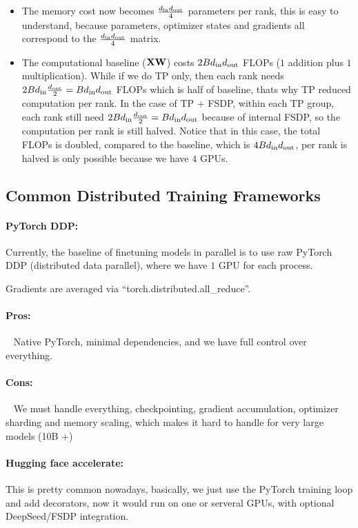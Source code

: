 \documentclass[11pt]{article}  %
\begin{document}
\begin{itemize}
  \item The memory cost now becomes $\frac{d_{\text{in}} d_{\text{out}}}{4}$ parameters per rank, this is easy to understand, because parameters, optimizer states and gradients all correspond to the $\frac{d_{\text{in}}d_{\text{out}}}{4}$ matrix.
  
  \item The computational baseline ($\mathbf{X}\mathbf{W}$) costs $2Bd_{\text{in}}d_{\text{out}}$ FLOPs ($1$ addition plus $1$ multiplication).
  While if we do TP only, then each rank needs $2Bd_{\text{in}} \frac{d_{\text{out}}}{2} = Bd_{\text{in}}d_{\text{out}}$ FLOPs which is half of baseline, thats why TP reduced computation per rank.
  In the case of TP + FSDP, within each TP group, each rank still need $2Bd_{\text{in}} \frac{d_{\text{out}}}{2} = Bd_{\text{in}}d_{\text{out}}$ because of internal FSDP, so the computation per rank is still halved.
  Notice that in this case, the total FLOPs is doubled, compared to the baseline, which is $4Bd_{\text{in}}d_{\text{out}}$, per rank is halved is only possible because we have $4$ GPUs.
\end{itemize}



\subsection{Common Distributed Training Frameworks}
\paragraph{PyTorch DDP:}
Currently, the baseline of finetuning models in parallel is to use raw PyTorch DDP (distributed data parallel), where we have $1$ GPU for each process.

Gradients are averaged via ``torch.distributed.all\_reduce''.

\paragraph{Pros:}

\textbullet~ Native PyTorch, minimal dependencies, and we have full control over everything.

\paragraph{Cons:}

\textbullet~ We must handle everything, checkpointing, gradient accumulation, optimizer sharding and memory scaling, which makes it hard to handle for very large models (10B +)

\paragraph{Hugging face accelerate:}
This is pretty common nowadays, basically, we just use the PyTorch training loop and add decorators, now it would run on one or serveral GPUs, with optional DeepSeed/FSDP integration.
\end{document}
